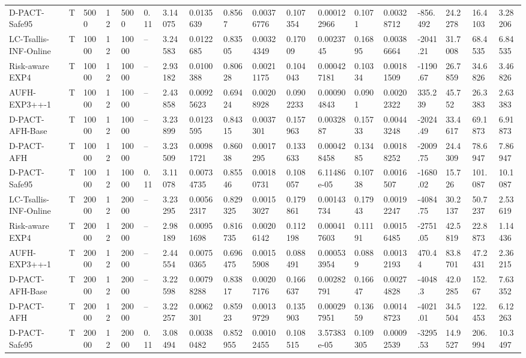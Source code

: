 \begin{tabular}{llllllllllllllllll}
D-PACT-Safe95 & T & 5000 & 12 & 5000 & 0.11 & 3.14075 & 0.0135639 & 0.8567 & 0.00376776 & 0.107354 & 0.000122966 & 0.1071 & 0.00328712 & -856.492 & 24.2278 & 16.4103 & 3.28206 \\ 
LC-Tsallis-INF-Online & T & 10000 & 12 & 10000 & -- & 3.24583 & 0.0122685 & 0.83505 & 0.00324349 & 0.17009 & 0.0023745 & 0.16895 & 0.00386664 & -2041.21 & 31.7008 & 68.4535 & 6.84535 \\ 
Risk-aware EXP4 & T & 10000 & 12 & 10000 & -- & 2.93182 & 0.0100388 & 0.80628 & 0.00211175 & 0.104043 & 0.000427181 & 0.10334 & 0.00181509 & -1190.67 & 26.7859 & 34.6826 & 3.46826 \\ 
AUFH-EXP3++-1 & T & 10000 & 12 & 10000 & -- & 2.43858 & 0.00925623 & 0.69424 & 0.00208928 & 0.0902233 & 0.000904843 & 0.0901 & 0.00202322 & 335.239 & 45.752 & 26.3383 & 2.63383 \\ 
D-PACT-AFH-Base & T & 10000 & 12 & 10000 & -- & 3.23899 & 0.0123595 & 0.84315 & 0.0037301 & 0.157963 & 0.0032887 & 0.15733 & 0.00443248 & -2024.49 & 33.4617 & 69.1873 & 6.91873 \\ 
D-PACT-AFH & T & 10000 & 12 & 10000 & -- & 3.23509 & 0.00981721 & 0.86038 & 0.0017295 & 0.133633 & 0.000428458 & 0.13485 & 0.00188252 & -2009.75 & 24.4309 & 78.6947 & 7.86947 \\ 
D-PACT-Safe95 & T & 10000 & 12 & 10000 & 0.11 & 3.11078 & 0.00734735 & 0.85546 & 0.00180731 & 0.108057 & 6.11486e-05 & 0.10738 & 0.0016507 & -1680.02 & 15.726 & 101.087 & 10.1087 \\ 
LC-Tsallis-INF-Online & T & 20000 & 12 & 20000 & -- & 3.23295 & 0.00562317 & 0.829325 & 0.00153027 & 0.179861 & 0.00143734 & 0.17943 & 0.00192247 & -4084.75 & 30.2137 & 50.7237 & 2.53619 \\ 
Risk-aware EXP4 & T & 20000 & 12 & 20000 & -- & 2.98189 & 0.00951698 & 0.816735 & 0.00206142 & 0.112198 & 0.000417603 & 0.11191 & 0.00156485 & -2751.05 & 42.5819 & 22.8873 & 1.14436 \\ 
AUFH-EXP3++-1 & T & 20000 & 12 & 20000 & -- & 2.44554 & 0.00750365 & 0.696475 & 0.00155908 & 0.088491 & 0.000533954 & 0.0889 & 0.00132193 & 470.44 & 83.8701 & 47.2431 & 2.36215 \\ 
D-PACT-AFH-Base & T & 20000 & 12 & 20000 & -- & 3.22598 & 0.00798288 & 0.83817 & 0.00207176 & 0.166637 & 0.00282791 & 0.16647 & 0.00274828 & -4048.3 & 42.0285 & 152.67 & 7.63352 \\ 
D-PACT-AFH & T & 20000 & 12 & 20000 & -- & 3.22257 & 0.0062301 & 0.85923 & 0.00139729 & 0.135903 & 0.000297951 & 0.13659 & 0.00148723 & -4021.01 & 34.5504 & 122.453 & 6.12263 \\ 
D-PACT-Safe95 & T & 20000 & 12 & 20000 & 0.11 & 3.08494 & 0.00380482 & 0.852955 & 0.00102455 & 0.108515 & 3.57383e-05 & 0.109305 & 0.00092539 & -3295.53 & 14.9527 & 206.994 & 10.3497 \\ 
\bottomrule
\end{tabular}
